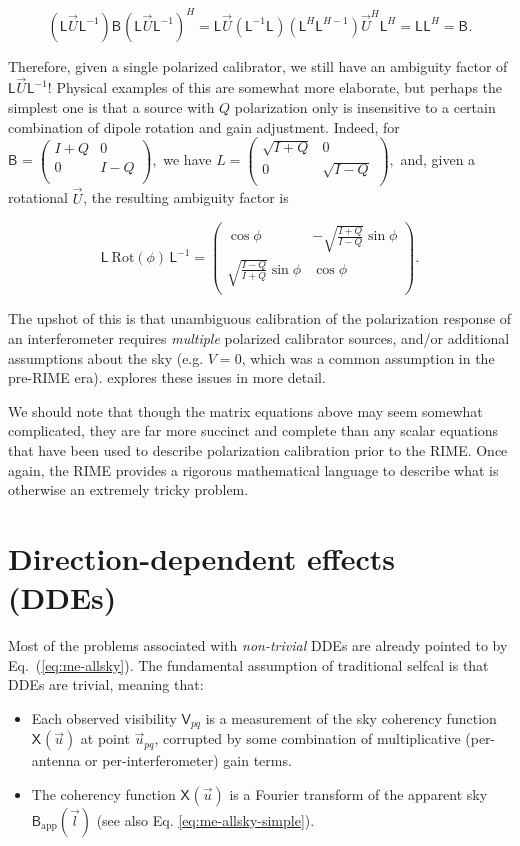 \documentclass[referee]{aa}
\newcommand{\matrixtt}[4]{\left( \begin{array}{cc}#1&#2\\#3&#4\\\end{array} \right)}
\newcommand{\herm}{H}
\newcommand{\jones}[2]{\vec {#1}_{#2}}
\newcommand{\jonesT}[2]{\vec {#1}^{\herm}_{#2}}
\newcommand{\coh}[2]{\mathsf{{#1}}_{{#2}}}
\begin{document}
\[
(\coh{L}{} \jones{U}{} \coh{L}{}^{-1}) \coh{B}{} (\coh{L}{} \jones{U}{} \coh{L}{}^{-1})^H = 
\coh{L}{} \jones{U}{} (\coh{L}{}^{-1}\coh{L}{})(\coh{L}{}^H\coh{L}{}^{H-1}) \jonesT{U}{}\coh{L}{}^H = \coh{L}{}\coh{L}{}^H = \coh{B}{}.
\]

Therefore, given a single polarized calibrator, we still have an ambiguity factor of $\coh{L}{} \jones{U}{} \coh{L}{}^{-1}$! Physical examples of this are somewhat more elaborate, but perhaps the simplest one is that a source with $Q$ polarization only is insensitive to a certain combination of dipole rotation and gain adjustment. Indeed, for $\coh{B}{}=\matrixtt{I+Q}{0}{0}{I-Q},$ we have $L=\matrixtt{\sqrt{I+Q}}{0}{0}{\sqrt{I-Q}},$ and, given a rotational $\jones{U}{}$, the resulting ambiguity factor is

\[
\coh{L}{} \, \mathrm{Rot}(\phi) \, \coh{L}{}^{-1} = \matrixtt{\cos\phi}{-\sqrt{\frac{I+Q}{I-Q}}\sin\phi}{\sqrt{\frac{I-Q}{I+Q}}\sin\phi}{\cos\phi}.
\]

The upshot of this is that unambiguous calibration of the polarization response of an interferometer requires {\em multiple} polarized calibrator sources, and/or additional assumptions about the sky (e.g. $V=0$, which was a common assumption in the pre-RIME era). \citet{ME5} explores these issues in more detail.

We should note that though the matrix equations above may seem somewhat complicated, they are far more succinct and complete than any scalar equations that have been used to describe polarization calibration prior to the RIME. Once again, the RIME provides a rigorous mathematical language to describe what is otherwise an extremely tricky problem.


\section{\label{sec:ddes}Direction-dependent effects (DDEs)}

Most of the problems associated with \emph{non-trivial} DDEs are already pointed to by Eq.~(\ref{eq:me-allsky}). The fundamental assumption of traditional selfcal is that DDEs are trivial, meaning that:

\begin{itemize}
\item Each observed visibility $\coh{V}{pq}$ is a measurement of the sky coherency function $\coh{X}{}(\vec u)$ at point $\vec u_{pq}$, corrupted by some combination of multiplicative (per-antenna or per-interferometer) gain terms.

\item The coherency function $\coh{X}{}(\vec u)$ is a Fourier transform of the apparent sky $\coh{B}{\mathrm{app}}(\vec l)$ (see also Eq. \ref{eq:me-allsky-simple}).
\end{itemize}
\end{document}
